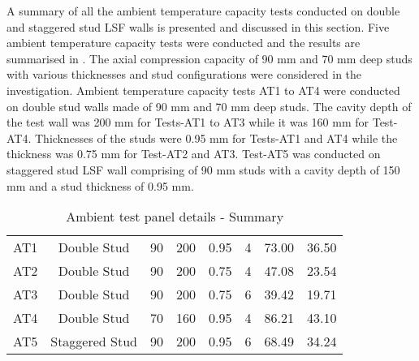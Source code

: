 A summary of all the ambient temperature capacity tests conducted on double and staggered stud LSF walls is presented and discussed in this section. Five ambient temperature capacity tests were conducted and the results are summarised in . The axial compression capacity of 90 mm and 70 mm deep studs with various thicknesses and stud configurations were considered in the investigation. Ambient temperature capacity tests AT1 to AT4 were conducted on double stud walls made of 90 mm and 70 mm deep studs. The cavity depth of the test wall was 200 mm for Tests-AT1 to AT3 while it was 160 mm for Test-AT4. Thicknesses of the studs were 0.95 mm for Tests-AT1 and AT4 while the thickness was 0.75 mm for Test-AT2 and AT3. Test-AT5 was conducted on staggered stud LSF wall comprising of 90 mm studs with a cavity depth of 150 mm and a stud thickness of 0.95 mm.  
\begin{table}[!htbp]
	\centering
	\caption{Ambient test panel details - Summary}
	\begin{tabular}{cccccccc}
		\toprule
		\multicolumn{1}{m{2.25em}}{\centering{Test Name}} & 
		\multicolumn{1}{m{5.6em}}{\centering{Description}} & 
		\multicolumn{1}{m{2.8em}}{\centering{Stud Depth (mm)}} & 
		\multicolumn{1}{m{2.8em}}{\centering{Cavity Depth (mm)}} & 
		\multicolumn{1}{m{4.5em}}{\centering{Stud Thickness (mm)}} & 
		\multicolumn{1}{m{2.5em}}{\centering{No of Studs}} &
		\multicolumn{1}{m{2.6em}}{\centering{Failure Load (kN)}} &
		\multicolumn{1}{m{2.6em}}{\centering{Failure Load Per Stud (kN)}} \\
		\midrule
		AT1  & Double Stud & 90 & 200 & 0.95 & 4 & 73.00 & 36.50 \\
		AT2  & Double Stud & 90 & 200 & 0.75 & 4 & 47.08 & 23.54 \\
		AT3  & Double Stud & 90 & 200 & 0.75 & 6 & 39.42 & 19.71 \\
		AT4  & Double Stud & 70 & 160 & 0.95 & 4 & 86.21 & 43.10\\
		AT5  & Staggered Stud & 90 & 200 & 0.95 & 6 & 68.49 & 34.24\\
		\bottomrule
	\end{tabular}%
	\label{tab:ambient-test-results}%
\end{table}%

